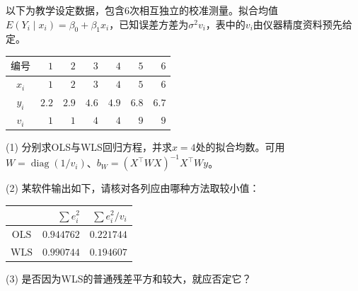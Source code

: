 以下为教学设定数据，包含6次相互独立的校准测量。拟合均值$E(Y_i\mid x_i)=\beta_0+\beta_1x_i$，已知误差方差为$\sigma^2v_i$，表中的$v_i$由仪器精度资料预先给定。\begin{center}\small\setlength{\tabcolsep}{5pt}
\begin{tabular}{crrrrrr}
\toprule
$\text{编号}$ & $1$ & $2$ & $3$ & $4$ & $5$ & $6$ \\
\midrule
$x_i$ & $1$ & $2$ & $3$ & $4$ & $5$ & $6$ \\
$y_i$ & $2.2$ & $2.9$ & $4.6$ & $4.9$ & $6.8$ & $6.7$ \\
$v_i$ & $1$ & $1$ & $4$ & $4$ & $9$ & $9$ \\
\bottomrule
\end{tabular}
\end{center}\par (1) 分别求OLS与WLS回归方程，并求$x=4$处的拟合均数。可用$W=\operatorname{diag}(1/v_i)$、$b_W=(X^\top WX)^{-1}X^\top Wy$。\par{}(2) 某软件输出如下，请核对各列应由哪种方法取较小值：\begin{center}\small\setlength{\tabcolsep}{5pt}
\begin{tabular}{crr}
\toprule
 & $\sum e_i^2$ & $\sum e_i^2/v_i$ \\
\midrule
$\mathrm{OLS}$ & $0.944762$ & $0.221744$ \\
$\mathrm{WLS}$ & $0.990744$ & $0.194607$ \\
\bottomrule
\end{tabular}
\end{center}\par (3) 是否因为WLS的普通残差平方和较大，就应否定它？

